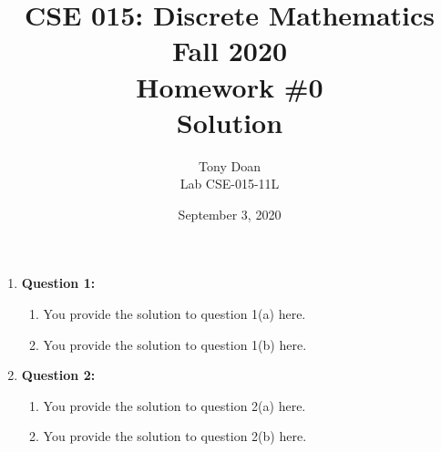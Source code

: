 \documentclass[11pt]{article}
\begin{document}
\author{Tony Doan\\
Lab CSE-015-11L }

\title{CSE 015: Discrete Mathematics\\
Fall 2020\\
Homework \#0\\
Solution}

\date{September 3, 2020}
\maketitle

\begin{enumerate}

\item
\textbf{Question 1:}

\begin{enumerate}[label=(\alph*)]
\item
You provide the solution to question 1(a) here.

\item
You provide the solution to question 1(b) here.

\end{enumerate}

\item
\textbf{Question 2:}

\begin{enumerate}[label=(\alph*)]
\item
You provide the solution to question 2(a) here.

\item
You provide the solution to question 2(b) here.

\end{enumerate}

\end{enumerate}
\end{document}

